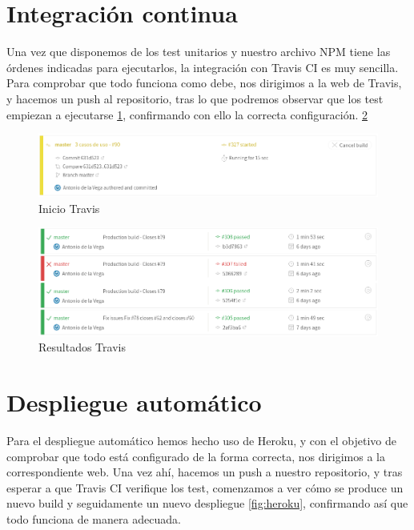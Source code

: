 \section {Integración continua}
Una vez que disponemos de los test unitarios y nuestro archivo NPM tiene las órdenes indicadas para ejecutarlos, la integración con Travis CI es muy sencilla. Para comprobar que todo funciona como debe, nos dirigimos a la web de Travis, y hacemos un push al repositorio, tras lo que podremos observar que los test empiezan a ejecutarse \ref{fig:travis}, confirmando con ello la correcta configuración. \ref{fig:travis2}

\begin{figure}
  \begin{center}
    \includegraphics[width=\textwidth]{imagenes/init_travis.png}
    \caption{Inicio Travis}
    \label{fig:travis}
  \end{center}
\end{figure}
\begin{figure}
  \begin{center}
    \includegraphics[width=\textwidth]{imagenes/travis.png}
    \caption{Resultados Travis}
    \label{fig:travis2}
  \end{center}
\end{figure}


\section {Despliegue automático}
Para el despliegue automático hemos hecho uso de Heroku, y con el objetivo de comprobar que todo está configurado de la forma correcta, nos dirigimos a la correspondiente web. Una vez ahí, hacemos un push a nuestro repositorio, y tras esperar a que Travis CI verifique los test, comenzamos a ver cómo se produce un nuevo \gls{build} y seguidamente un nuevo despliegue \ref{fig:heroku}, confirmando así que todo funciona de manera adecuada.


